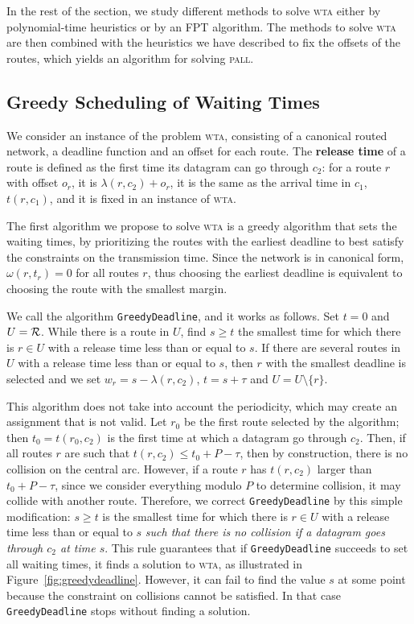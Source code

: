 \documentclass[a4paper,10pt]{journal}
\newcommand\greedydeadline{\texttt{GreedyDeadline}\xspace}
\newcommand\pall{\textsc{pall}\xspace}
\newcommand\wta{\textsc{wta}\xspace}
\begin{document}
   In the rest of the section, we study different methods to solve \wta either by polynomial-time heuristics or by an FPT algorithm. The methods to solve \wta are then combined with the heuristics we have described to fix the offsets of the routes, which yields an algorithm for solving \pall.  
   
   \subsection{Greedy Scheduling of Waiting Times}

   We consider an instance of the problem \wta, consisting of a canonical routed network, a deadline function and an offset for each route. The \textbf{release time} of a route is defined as the first time its datagram can go through $c_2$: for a route $r$ with offset $o_r$, it is $\lambda(r,c_2) + o_r$, it is the same as the arrival time in $c_1$, $t(r,c_1)$, and it is fixed in an instance of \wta.

    The first algorithm we propose to solve \wta is a greedy algorithm that sets the waiting times, by prioritizing the routes with the earliest deadline to best satisfy the constraints on the transmission time. Since the network is in canonical form, $\omega(r,t_r) = 0$ for all routes $r$, thus choosing the earliest deadline is equivalent to choosing the route with the smallest margin.
    
    We call the algorithm \greedydeadline, and it works as follows. Set $t=0$ and $U = \cal{R}$. While there is a route in $U$, find $s \geq t$ the smallest time for which there is $r \in U$ with a release time less than or equal to $s$. If there are several routes in $U$ with a release time less than or equal to $s$, then $r$ with the smallest deadline is selected and we set $w_r = s - \lambda(r,c_2)$, $t = s + \tau$ and $ U = U \setminus \{r\}$.

    This algorithm does not take into account the periodicity, which may create an assignment that is not valid. Let $r_0$ be the first route selected by the algorithm; then $t_0 = t(r_0,c_2)$ is the first time at which a datagram go through $c_2$.
	Then, if all routes $r$ are such that $t(r, c_2) \leq t_0 + P - \tau$, 
	then by construction, there is no collision on the central arc.
      However, if a route $r$ has $t(r, c_2)$ larger than $t_0 + P - \tau$, since we consider everything modulo $P$ to determine collision, it may collide with another route. Therefore, we correct \greedydeadline by this simple modification: $s \geq t$ is the smallest time for which there is $r \in U$ with a release time less than or equal to $s$ \emph{such that there is no collision if a datagram goes through $c_2$ at time $s$}. This rule guarantees that if \greedydeadline succeeds to set all waiting times, it finds a solution to \wta, as illustrated in Figure~\ref{fig:greedydeadline}. However, it can fail to find the value $s$ at some point because the constraint on collisions cannot be satisfied. In that case \greedydeadline stops without finding a solution.
    
\end{document}
